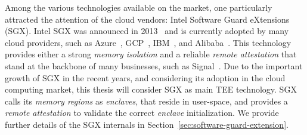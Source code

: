 Among the various technologies available on the market, one particularly 
attracted the attention of the cloud vendors: Intel Software Guard eXtensions 
(SGX).
Intel SGX was announced in 2013~\citep{rozas2013intel} and is currently 
adopted 
by many cloud providers, such as Azure~\citep{azure}, 
GCP~\citep{challita2018precise}, IBM~\citep{IBM}, and 
Alibaba~\citep{alibabasgx}.
This technology provides either a strong \emph{memory isolation} and a 
reliable 
\emph{remote attestation} that stand at the backbone of many businesses, such 
as Signal~\citep{signal}.
Due to the important growth of SGX in the recent years, and considering its 
adoption in the cloud computing market, this thesis will consider SGX as main 
TEE technology.
SGX calls its \emph{memory regions} as \emph{enclaves}, that reside in 
user-space, and provides a \emph{remote attestation} to validate the correct 
\emph{enclave} initialization.
We provide further details of the SGX internals in 
Section~\ref{sec:software-guard-extension}.


